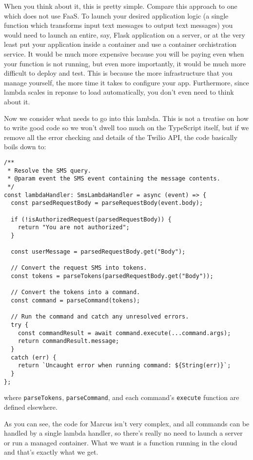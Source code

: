 \documentclass{article}
\begin{document}
When you think about it, this is pretty simple.
Compare this approach to one which does not use FaaS.
To launch your desired application logic (a single function which transforms input text messages to output text messages) you would need to launch an entire, say, Flask application on a server, or at the very least put your application inside a container and use a container orchistration service.
It would be much more expensive because you will be paying even when your function is not running, but even more importantly, it would be much more difficult to deploy and test.
This is because the more infrastructure that you manage yourself, the more time it takes to configure your app.
Furthermore, since lambda scales in reponse to load automatically, you don't even need to think about it.

Now we consider what needs to go into this lambda.
This is not a treatise on how to write good code so we won't dwell too much on the TypeScript itself, but if we remove all the error checking and details of the Twilio API, the code basically boils down to:

\begin{verbatim}
/**
 * Resolve the SMS query.
 * @param event the SMS event containing the message contents.
 */
const lambdaHandler: SmsLambdaHandler = async (event) => {
  const parsedRequestBody = parseRequestBody(event.body);

  if (!isAuthorizedRequest(parsedRequestBody)) {
    return "You are not authorized";
  }

  const userMessage = parsedRequestBody.get("Body");

  // Convert the request SMS into tokens.
  const tokens = parseTokens(parsedRequestBody.get("Body"));

  // Convert the tokens into a command.
  const command = parseCommand(tokens);

  // Run the command and catch any unresolved errors.
  try {
    const commandResult = await command.execute(...command.args);
    return commandResult.message;
  }
  catch (err) {
    return `Uncaught error when running command: ${String(err)}`;
  }
};
\end{verbatim}

where \texttt{parseTokens}, \texttt{parseCommand}, and each command's \texttt{execute} function are defined elsewhere.

As you can see, the code for Marcus isn't very complex, and all commands can be handled by a single lambda handler, so there's really no need to launch a server or run a managed container.
What we want is a function running in the cloud and that's exactly what we get.
\end{document}
